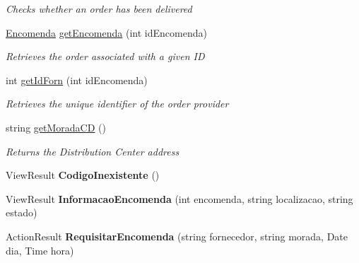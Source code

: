 \begin{DoxyCompactItemize}
\begin{DoxyCompactList}\small\item\em Checks whether an order has been delivered \end{DoxyCompactList}\item 
\mbox{\hyperlink{classmvc_j_j_m_s_1_1_models_1_1_encomenda}{Encomenda}} \mbox{\hyperlink{classmvc_j_j_m_s_1_1_controllers_1_1_encomenda_controller_adbeb0c2e410bf9d8706de7b75daf05eb}{get\+Encomenda}} (int id\+Encomenda)
\begin{DoxyCompactList}\small\item\em Retrieves the order associated with a given ID \end{DoxyCompactList}\item 
int \mbox{\hyperlink{classmvc_j_j_m_s_1_1_controllers_1_1_encomenda_controller_a27c059ba95c4c7fcd3f3c1d0d2bf51a9}{get\+Id\+Forn}} (int id\+Encomenda)
\begin{DoxyCompactList}\small\item\em Retrieves the unique identifier of the order provider \end{DoxyCompactList}\item 
string \mbox{\hyperlink{classmvc_j_j_m_s_1_1_controllers_1_1_encomenda_controller_a2754bcfc4246dcc86737356fb5ff925a}{get\+Morada\+CD}} ()
\begin{DoxyCompactList}\small\item\em Returns the Distribution Center address \end{DoxyCompactList}\item 
\mbox{\label{classmvc_j_j_m_s_1_1_controllers_1_1_encomenda_controller_ab511489501a36b25d8211cd9ee87284b}} 
View\+Result {\bfseries Codigo\+Inexistente} ()
\item 
\mbox{\label{classmvc_j_j_m_s_1_1_controllers_1_1_encomenda_controller_a106850b52d6c0495216ff69b82490eee}} 
View\+Result {\bfseries Informacao\+Encomenda} (int encomenda, string localizacao, string estado)
\item 
\mbox{\label{classmvc_j_j_m_s_1_1_controllers_1_1_encomenda_controller_a975c0c2e5081227c02fdfdb7e3e159d0}} 
Action\+Result {\bfseries Requisitar\+Encomenda} (string fornecedor, string morada, Date dia, Time hora)
\item 

\end{DoxyCompactItemize}
